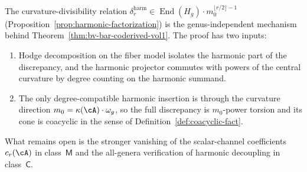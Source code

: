 \begin{remark}
\label{rem:bv-bar-coderived-higher-genus}%
%
The curvature-divisibility relation
$\delta_r^{\mathrm{harm}} \in \operatorname{End}(H_g)\cdot
m_0^{\lfloor r/2 \rfloor - 1}$
\textup{(}Proposition~\ref{prop:harmonic-factorization}\textup{)}
is the genus-independent mechanism behind
Theorem~\ref{thm:bv-bar-coderived-vol1}. The proof has two inputs:
\begin{enumerate}[label=\textup{(\roman*)},nosep]
\item Hodge decomposition on the fiber model isolates the harmonic
 part of the discrepancy, and the harmonic projector commutes with
 powers of the central curvature by degree counting on the harmonic
 summand.
\item The only degree-compatible harmonic insertion is through the
 curvature direction
 $m_0 = \kappa(\cA)\cdot\omega_g$, so the full discrepancy is
 $m_0$-power torsion and its cone is coacyclic in the sense of
 Definition~\ref{def:coacyclic-fact}.
\end{enumerate}
What remains open is the stronger vanishing of the scalar-channel
coefficients $c_r(\cA)$ in class~$\mathsf{M}$ and the all-genera
verification of harmonic decoupling in class~$\mathsf{C}$.
\end{remark}

